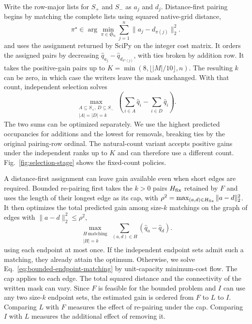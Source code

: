 \documentclass[journal]{IEEEtran}
\begin{document}
Write the row-major lists for \(S_+\) and \(S_-\) as \(a_j\) and \(d_j\). Distance-first pairing begins by matching the complete lists using squared native-grid distance,
\begin{equation}
\pi^\star\in\arg\min_{\pi\in\mathfrak S_n}
  \sum_{j=1}^n\|a_j-d_{\pi(j)}\|_2^2 .
\label{eq:fixed-assignment}
\end{equation}
and uses the assignment returned by SciPy on the integer cost matrix. It orders the assigned pairs by decreasing \(\widehat q_{a_j}-\widehat q_{d_{\pi^\star(j)}}\), with ties broken by addition row. It takes the positive-gain pairs up to \(K=\min(8,\lfloor |M|/10\rfloor,n)\). The resulting \(k\) can be zero, in which case the writers leave the mask unchanged. With that count, independent selection solves
\begin{equation}
\max_{\substack{A\subseteq S_+,\,D\subseteq S_-\\ |A|=|D|=k}}
  \left(\sum_{i\in A}\widehat q_i-\sum_{i\in D}\widehat q_i\right).
\label{eq:independent-estimated-gain}
\end{equation}
The two sums can be optimized separately. We use the highest predicted occupancies for additions and the lowest for removals, breaking ties by the original pairing-row ordinal. The natural-count variant accepts positive gains under the independent ranks up to \(K\) and can therefore use a different count. Fig.~\ref{fig:selection-stage} shows the fixed-count policies.

A distance-first assignment can leave gain available even when short edges are required. Bounded re-pairing first takes the \(k>0\) pairs \(H_{\rm fix}\) retained by \(F\) and uses the length of their longest edge as its cap, with \(\rho^2=\max_{(a,d)\in H_{\rm fix}}\|a-d\|_2^2\). It then optimizes the total predicted gain among size-\(k\) matchings on the graph of edges with \(\|a-d\|_2^2\le\rho^2\),
\begin{equation}
\max_{\substack{H\ \text{matching}\\ |H|=k}}
\sum_{(a,d)\in H}(\widehat q_a-\widehat q_d).
\label{eq:bounded-endpoint-matching}
\end{equation}
using each endpoint at most once. If the independent endpoint sets admit such a matching, they already attain the optimum. Otherwise, we solve Eq.~\eqref{eq:bounded-endpoint-matching} by unit-capacity minimum-cost flow. The cap applies to each edge. The total squared distance and the connectivity of the written mask can vary. Since \(F\) is feasible for the bounded problem and \(I\) can use any two size-\(k\) endpoint sets, the estimated gain is ordered from \(F\) to \(L\) to \(I\). Comparing \(L\) with \(F\) measures the effect of re-pairing under the cap. Comparing \(I\) with \(L\) measures the additional effect of removing it.
\end{document}
